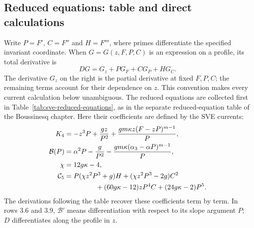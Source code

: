 \subsection{Reduced equations: table and direct calculations}
Write $P=F'$, $C=F''$ and $H=F'''$, where primes differentiate the
specified invariant coordinate. When $G=G(z,F,P,C)$ is an expression
on a profile, its total derivative is
\begin{equation}
 D G=G_z+PG_F+CG_P+HG_C.
 \label{eq:sve-profile-total}
\end{equation}
The derivative $G_z$ on the right is the partial derivative at fixed
$F,P,C$; the remaining terms account for their dependence on $z$.
This convention makes every current calculation below unambiguous.
The reduced equations are collected first in
Table~\ref{tab:sve-reduced-equations}, as in the separate reduced-equation
table of the Boussinesq chapter. Here their coefficients are defined by
the SVE currents:
\begin{align*}
 K_4&=-z^3P+\frac{gz}{P^2}
           +\frac{gm\kappa z(F-zP)^{m-1}}P,\\
 \mathcal B(P)&=\alpha^2P-\frac g{P^2}
           -\frac{gm\kappa(\alpha_3-\alpha P)^{m-1}}P,\\
 \chi&=12g\kappa-4,\\
 \mathcal C_5&=P(\chi z^2P^3+g)H+(\chi z^2P^3-2g)C^2\\
 &\hspace{1.6cm}+(60g\kappa-12)zP^4C+(24g\kappa-2)P^5.
\end{align*}
The derivations following the table recover these coefficients term by term.
In rows 3.6 and 3.9, $\mathcal B'$ means differentiation with respect to
its slope argument $P$; $D$ differentiates along the profile in $z$.

